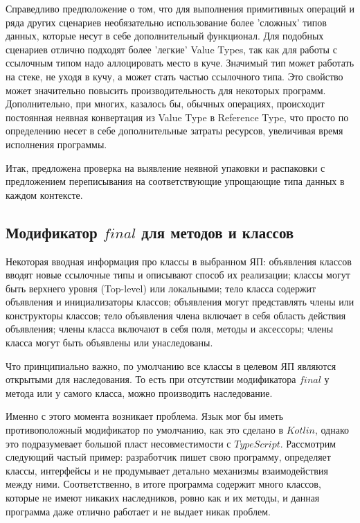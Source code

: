 \documentclass{mipt-thesis-bs}
\begin{document}
Справедливо предположение о том, что для выполнения примитивных операций и ряда других
сценариев необязательно использование более 'сложных' типов данных, которые несут 
в себе дополнительный функционал.
Для подобных сценариев отлично подходят более 'легкие' Value Types, так как для работы 
с ссылочным типом надо аллоцировать место в куче. Значимый тип может работать на 
стеке, не уходя в кучу, а может стать частью ссылочного типа. 
Это свойство может значительно повысить производительность для некоторых программ.
Дополнительно, при многих, казалось бы, обычных операциях, происходит постоянная неявная
конвертация из Value Type в Reference Type, что просто по определению несет в себе 
дополнительные затраты ресурсов, увеличивая время исполнения программы.

Итак, предложена проверка на выявление неявной упаковки и распаковки с предложением
переписывания на соответствующие упрощающие типа данных в каждом контексте.


\subsection{Модификатор $final$ для методов и классов}

Некоторая вводная информация про классы в выбранном ЯП: объявления классов 
вводят новые ссылочные типы и описывают способ их реализации;
классы могут быть верхнего уровня (Top-level) или локальными;
тело класса содержит объявления и инициализаторы классов;
объявления могут представлять члены или конструкторы классов;
тело объявления члена включает в себя область действия объявления;
члены класса включают в себя поля, методы и аксессоры; члены класса могут 
быть объявлены или унаследованы.

Что принципиально важно, по умолчанию все классы в целевом ЯП являются открытыми
для наследования. То есть при отсутствии модификатора $final$ у метода или 
у самого класса, можно производить наследование.

Именно с этого момента возникает проблема. Язык мог бы иметь противоположный
модификатор по умолчанию, как это сделано в $Kotlin$, однако это подразумевает большой пласт несовместимости
с $TypeScript$. Рассмотрим следующий частый пример: разработчик пишет свою программу, 
определяет классы, интерфейсы и не продумывает детально механизмы взаимодействия между ними.
Соответственно, в итоге программа содержит много классов, которые не имеют никаких 
наследников, ровно как и их методы, и данная программа даже отлично работает и не выдает
никак проблем.
\end{document}
